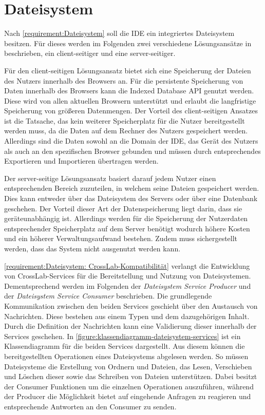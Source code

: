 \section{Dateisystem}\label{section:konzeption:dateisystem}

Nach \autoref{requirement:Dateisystem} soll die IDE ein integriertes Dateisystem besitzen. Für dieses werden im Folgenden zwei verschiedene Lösungsansätze in beschrieben, ein client-seitiger und eine server-seitiger.

Für den client-seitigen Lösungsansatz bietet sich eine Speicherung der Dateien des Nutzers innerhalb des Browsers an. Für die persistente Speicherung von Daten innerhalb des Browsers kann die Indexed Database API \cite{noauthor_indexed-database-api_nodate} genutzt werden. Diese wird von allen aktuellen Browsern unterstützt und erlaubt die langfristige Speicherung von größeren Datenmengen. Der Vorteil des client-seitigen Ansatzes ist die Tatsache, das kein weiterer Speicherplatz für die Nutzer bereitgestellt werden muss, da die Daten auf dem Rechner des Nutzers gespeichert werden. Allerdings sind die Daten sowohl an die Domain der IDE, das Gerät des Nutzers als auch an den spezifischen Browser gebunden und müssen durch entsprechendes Exportieren und Importieren übertragen werden.

Der server-seitige Lösungsansatz basiert darauf jedem Nutzer einen entsprechenden Bereich zuzuteilen, in welchem seine Dateien gespeichert werden. Dies kann entweder über das Dateisystem des Servers oder über eine Datenbank geschehen. Der Vorteil dieser Art der Datenspeicherung liegt darin, dass sie geräteunabhängig ist. Allerdings werden für die Speicherung der Nutzerdaten entsprechender Speicherplatz auf dem Server benötigt wodurch höhere Kosten und ein höherer Verwaltungsaufwand bestehen. Zudem muss sichergestellt werden, dass das System nicht ausgenutzt werden kann.

\autoref{requirement:Dateisystem: CrossLab-Kompatibilität} verlangt die Entwicklung von CrossLab-Services für die Bereitstellung und Nutzung von Dateisystemen. Dementsprechend werden im Folgenden der \textit{Dateisystem Service Producer} und der \textit{Dateisystem Service Consumer} beschrieben. Die grundlegende Kommunikation zwischen den beiden Services geschieht über den Austausch von Nachrichten. Diese bestehen aus einem Typen und dem dazugehörigen Inhalt. Durch die Definition der Nachrichten kann eine Validierung dieser innerhalb der Services geschehen. In \autoref{figure:klassendiagramm-dateisystem-services} ist ein Klassendiagramm für die beiden Services dargestellt. Aus diesem können die bereitgestellten Operationen eines Dateisystems abgelesen werden. So müssen Dateisysteme die Erstellung von Ordnern und Dateien, das Lesen, Verschieben und Löschen dieser sowie das Schreiben von Dateien unterstützen. Dabei besitzt der Consumer Funktionen um die einzelnen Operationen auszuführen, während der Producer die Möglichkeit bietet auf eingehende Anfragen zu reagieren und entsprechende Antworten an den Consumer zu senden.

